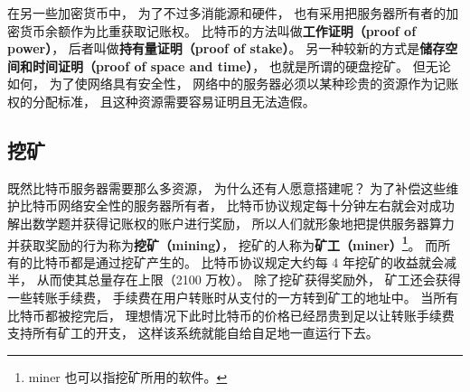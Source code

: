在另一些加密货币中， 为了不过多消能源和硬件， 也有采用把服务器所有者的加密货币余额作为比重获取记账权。 比特币的方法叫做\textbf{工作证明（proof of power）}， 后者叫做\textbf{持有量证明（proof of stake）}。 另一种较新的方式是\textbf{储存空间和时间证明（proof of space and time）}， 也就是所谓的硬盘挖矿。 但无论如何， 为了使网络具有安全性， 网络中的服务器必须以某种珍贵的资源作为记账权的分配标准， 且这种资源需要容易证明且无法造假。

\subsection{挖矿}
既然比特币服务器需要那么多资源， 为什么还有人愿意搭建呢？ 为了补偿这些维护比特币网络安全性的服务器所有者， 比特币协议规定每十分钟左右就会对成功解出数学题并获得记账权的账户进行奖励， 所以人们就形象地把提供服务器算力并获取奖励的行为称为\textbf{挖矿（mining）}， 挖矿的人称为\textbf{矿工（miner）\footnote{miner 也可以指挖矿所用的软件。}}。 而所有的比特币都是通过挖矿产生的。 比特币协议规定大约每 4 年挖矿的收益就会减半， 从而使其总量存在上限（2100 万枚）。 除了挖矿获得奖励外， 矿工还会获得一些转账手续费， 手续费在用户转账时从支付的一方转到矿工的地址中。 当所有比特币都被挖完后， 理想情况下此时比特币的价格已经昂贵到足以让转账手续费支持所有矿工的开支， 这样该系统就能自给自足地一直运行下去。

